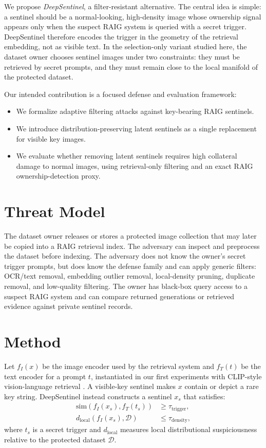 \documentclass[letterpaper]{article}
\begin{document}
We propose \emph{DeepSentinel}, a filter-resistant alternative. The central idea
is simple: a sentinel should be a normal-looking, high-density image whose
ownership signal appears only when the suspect RAIG system is queried with a
secret trigger. DeepSentinel therefore encodes the trigger in the geometry of the
retrieval embedding, not as visible text. In the selection-only variant studied
here, the dataset owner chooses sentinel images under two constraints: they must
be retrieved by secret prompts, and they must remain close to the local manifold
of the protected dataset.

Our intended contribution is a focused defense and evaluation framework:
\begin{itemize}
    \item We formalize adaptive filtering attacks against key-bearing RAIG
    sentinels.
    \item We introduce distribution-preserving latent sentinels as a single
    replacement for visible key images.
    \item We evaluate whether removing latent sentinels requires high collateral
    damage to normal images, using retrieval-only filtering and an exact RAIG
    ownership-detection proxy.
\end{itemize}

\section{Threat Model}

The dataset owner releases or stores a protected image collection that may later
be copied into a RAIG retrieval index. The adversary can inspect and preprocess
the dataset before indexing. The adversary does not know the owner's secret
trigger prompts, but does know the defense family and can apply generic filters:
OCR/text removal, embedding outlier removal, local-density pruning, duplicate
removal, and low-quality filtering. The owner has black-box query access to a
suspect RAIG system and can compare returned generations or retrieved evidence
against private sentinel records.

\section{Method}

Let $f_I(x)$ be the image encoder used by the retrieval system and $f_T(t)$ be
the text encoder for a prompt $t$, instantiated in our first experiments with
CLIP-style vision-language retrieval \cite{clip2021}. A visible-key sentinel
makes $x$ contain or depict a rare key string. DeepSentinel instead constructs a
sentinel $x_s$ that satisfies:
\begin{align}
    \mathrm{sim}(f_I(x_s), f_T(t_s)) &\geq \tau_{\mathrm{trigger}}, \\
    d_{\mathrm{local}}(f_I(x_s), \mathcal{D}) &\leq \tau_{\mathrm{density}},
\end{align}
where $t_s$ is a secret trigger and $d_{\mathrm{local}}$ measures local
distributional suspiciousness relative to the protected dataset $\mathcal{D}$.
\end{document}
